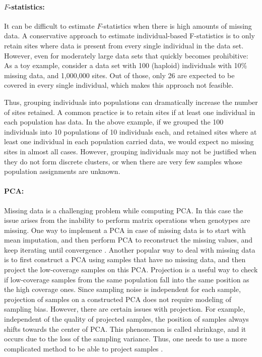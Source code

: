 \documentclass[12pt, letterpaper]{article}
\begin{document}
\paragraph{$F$-statistics:}
It can be difficult to estimate $F$-statistics when there is high amounts of missing data. A conservative approach to estimate individual-based F-statistics is to only retain sites where data is present from every single individual in the data set. However, even for moderately large data sets that quickly becomes prohibitive: As a toy example, consider a data set with 100 (haploid) individuals with 10\% missing data, and 1,000,000 sites. Out of those, only 26 are expected to be covered in every single individual, which makes this approach not feasible.

Thus, grouping individuals into populations can dramatically increase the number of sites retained. A common practice is to retain sites if at least one individual in each population has data. In the above example, if we grouped the 100 individuals into 10 populations of 10 individuals each, and retained sites where at least one individual in each population carried data, we would expect no missing sites in almost all cases. However, grouping individuals may not be justified when they do not form discrete clusters, or when there are very few samples whose population assignments are unknown.

\paragraph{PCA:}
Missing data is a challenging problem while computing PCA. In this case the issue arises from the inability to perform matrix operations when genotypes are missing. One way to implement a PCA in case of missing data is to start with mean imputation, and then perform PCA to reconstruct the missing values, and keep iterating until convergence \cite{meisner_large-scale_2021}. Another popular way to deal with missing data is to first construct a PCA using samples that have no missing data, and then project the low-coverage samples on this PCA. Projection is a useful way to check if low-coverage samples from the same population fall into the same position as the high coverage ones. Since sampling noise is independent for each sample, projection of samples on a constructed PCA does not require modeling of sampling bias. However, there are certain issues with projection. For example, independent of the quality of projected samples, the position of samples always shifts towards the center of PCA. This phenomenon is called shrinkage, and it occurs due to the loss of the sampling variance. Thus, one needs to use a more complicated method to be able to project samples \cite{smartpca}.
\end{document}
